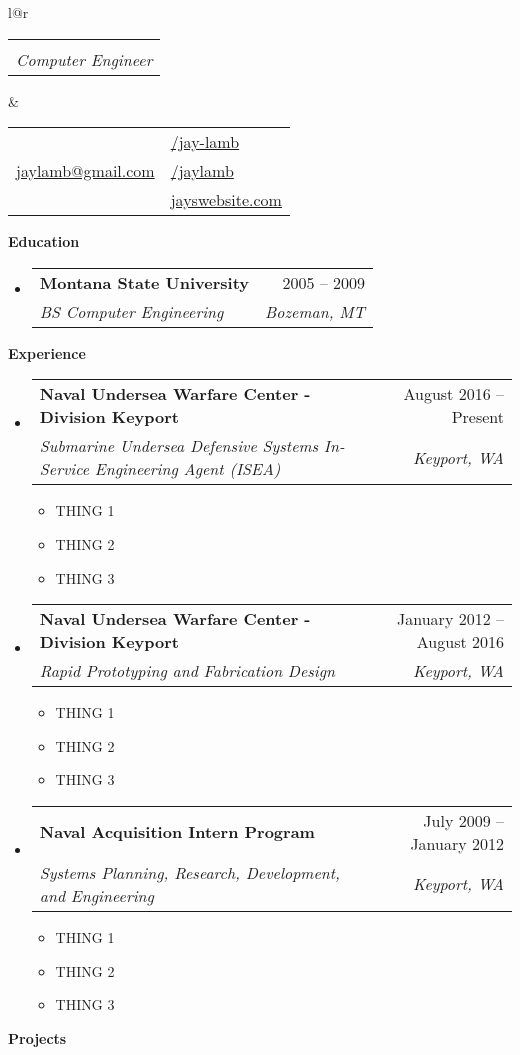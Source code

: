 \documentclass[letterpaper,12pt]{article}
\makeatletter
\def \fullname {Jay D. Lamb}
\def \subtitle {Computer Engineer}
\def \linkedinicon {\faLinkedin}
\def \linkedinlink {http://www.linkedin.com/in/jay-lamb-032166174/}
\def \linkedintext {/jay-lamb}
\def \phoneicon {\faPhone}
\def \phonetext {+1-406-598-4072}
\def \emailicon {\faEnvelope}
\def \emaillink {mailto:jaylamb@gmail.com}
\def \emailtext {jaylamb@gmail.com}
\def \githubicon {\faGithub}
\def \githublink {https://github.com/jaylamb}
\def \githubtext {/jaylamb}
\def \websiteicon {\faGlobe}
\def \websitelink {https://google.com/}
\def \websitetext {jayswebsite.com}
\def \headertype {\doublecol} %
\def \entryspacing {-0pt}
\def \linkedin {\linkedinicon \hspace{3pt}\href{\linkedinlink}{\linkedintext}}
\def \phone {\phoneicon \hspace{3pt}{ \phonetext}}
\def \email {\emailicon \hspace{3pt}\href{\emaillink}{\emailtext}}
\def \github {\githubicon \hspace{3pt}\href{\githublink}{\githubtext}}
\def \website {\websiteicon \hspace{3pt}\href{\websitelink}{\websitetext}}
\renewcommand{\section}[2]{\vspace{5pt}
  \colorbox{secondary}{\color{white}\raggedbottom\normalsize\textbf{{#1}{\hspace{7pt}#2}}}
}
\newcommand{\resumeEntryStart}{\begin{itemize}[leftmargin=2.5mm]}
\newcommand{\resumeEntryEnd}{\end{itemize}\vspace{\entryspacing}}
\newcommand{\resumeItemListStart}{\begin{itemize}[leftmargin=4.5mm]}
\newcommand{\resumeItemListEnd}{\end{itemize}}
\newcommand{\resumeItem}[1]{
  \item\small{
    {#1 \vspace{-2pt}}
  }
}
\newcommand{\resumeEntryTSDL}[4]{
  \vspace{-1pt}\item[]
    \begin{tabular*}{0.97\textwidth}{l@{\extracolsep{\fill}}r}
      \textbf{\color{primary}#1} & {\firabook\color{accent}\small#2} \\
      \textit{\color{accent}\small#3} & \textit{\color{accent}\small#4} \\
    \end{tabular*}\vspace{-6pt}
}
\newcommand{\doublecol}[6]{
  \begin{tabular*}{\textwidth}{l@{\extracolsep{\fill}}r}
    {
      \begin{tabular}[c]{l}
        \fontsize{35}{45}\selectfont{\color{primary}{{\textbf{\fullname}}}} \\
        {\textit{\subtitle}} %
      \end{tabular}
    } & {
      \begin{tabular}[c]{l@{\hspace{1.5em}}l}
        {\small#4} & {\small#1} \\
        {\small#5} & {\small#2} \\
        {\small#6} & {\small#3}
      \end{tabular}
    }
  \end{tabular*}
}
\newcommand{\singlecol}[6]{
  \begin{tabular*}{\textwidth}{l@{\extracolsep{\fill}}r}
    {
      \begin{tabular}[b]{l}
        \fontsize{35}{45}\selectfont{\color{primary}{{\textbf{\fullname}}}} \\
        {\textit{\subtitle}} %
      \end{tabular}
    } & {
      \begin{tabular}[c]{l}
        {\small#1} \\
        {\small#2} \\
        {\small#3} \\
        {\small#4} \\
        {\small#5} \\
        {\small#6}
      \end{tabular}
    }
  \end{tabular*}
}
\makeatother
\begin{document}

\headertype{\linkedin}{\github}{\website}{\phone}{\email}{}

\section{\faGraduationCap}{Education}

  \resumeEntryStart
    \resumeEntryTSDL
      {Montana State University}{2005 -- 2009}
      {BS Computer Engineering}{Bozeman, MT}
  \resumeEntryEnd

\section{\faLaptopCode}{Experience}

  \resumeEntryStart
    \resumeEntryTSDL
      {Naval Undersea Warfare Center - Division Keyport}{August 2016 -- Present}
      {Submarine Undersea Defensive Systems In-Service Engineering Agent (ISEA)}{Keyport, WA}
    \resumeItemListStart
      \resumeItem {THING 1}
      \resumeItem {THING 2}
      \resumeItem {THING 3}
    \resumeItemListEnd
  \resumeEntryEnd

  \resumeEntryStart
    \resumeEntryTSDL
      {Naval Undersea Warfare Center - Division Keyport}{January 2012 -- August 2016}
      {Rapid Prototyping and Fabrication Design}{Keyport, WA}
    \resumeItemListStart
      \resumeItem {THING 1}
      \resumeItem {THING 2}
      \resumeItem {THING 3}
    \resumeItemListEnd
  \resumeEntryEnd

  \resumeEntryStart
    \resumeEntryTSDL
      {Naval Acquisition Intern Program }{July 2009 -- January 2012}
      {Systems Planning, Research, Development, and Engineering}{Keyport, WA}
    \resumeItemListStart
      \resumeItem {THING 1}
      \resumeItem {THING 2}
      \resumeItem {THING 3}
    \resumeItemListEnd
  \resumeEntryEnd



\section{\faFlask}{Projects}
\end{document}
